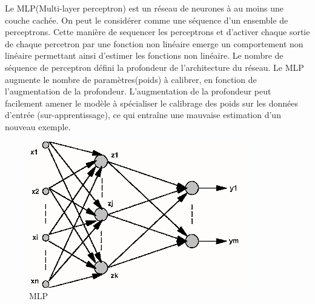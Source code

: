 Le MLP(Multi-layer perceptron) est un réseau de neurones à au moins une couche cachée. On peut le considérer comme une séquence d'un ensemble de perceptrons. Cette manière de sequencer les perceptrons et d'activer chaque sortie de chaque percetron par une fonction non linéaire emerge un comportement non linéaire permettant ainsi d'estimer les fonctions non linéaire. Le nombre de séquence de perceptron défini la profondeur de l'architecture du réseau. Le MLP augmente le nombre de paramètres(poids) à calibrer, en fonction de l'augmentation de la profondeur. L'augmentation de la profondeur peut facilement amener le modèle à spécialiser le calibrage des poids sur les données d'entrée (sur-apprentissage), ce qui entraîne une mauvaise estimation d'un nouveau exemple.  
\begin{figure}[H]
    \centering
    \includegraphics[scale = 0.5]{images/multicouche.png}
    \caption{MLP}
    \label{mlp}
\end{figure}

